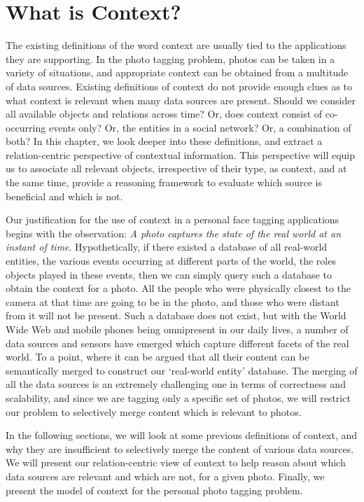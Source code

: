 \chapter{What is Context?}

The existing definitions of the word context are usually tied to the applications they are supporting. In the photo tagging problem, photos can be taken in a variety of situations, and appropriate context can be obtained from a multitude of data sources. Existing definitions of context do not provide enough clues as to what context is relevant when many data sources are present. Should we consider all available objects and relations across time? Or, does context consist of co-occurring events only? Or, the entities in a social network? Or, a combination of both? In this chapter, we look deeper into these definitions, and extract a relation-centric perspective of contextual information. This perspective will equip us to associate all relevant objects, irrespective of their type, as context, and at the same time, provide a reasoning framework to evaluate which source is beneficial and which is not.

Our justification for the use of context in a personal face tagging applications begins with the observation: \textit{A photo captures the state of the real world at an instant of time}. Hypothetically, if there existed a database of all real-world entities, the various events occurring at different parts of the world, the roles objects played in these events, then we can simply query such a database to obtain the context for a photo. All the people who were physically closest to the camera at that time are going to be in the photo, and those who were distant from it will not be present. Such a database does not exist, but with the World Wide Web and mobile phones being omnipresent in our daily lives, a number of data sources and sensors have emerged which capture different facets of the real world. To a point, where it can be argued that all their content can be semantically merged to construct our `real-world entity' database. The merging of all the data sources is an extremely challenging one in terms of correctness and scalability, and since we are tagging only a specific set of photos, we will restrict our problem to selectively merge content which is relevant to photos.

In the following sections, we will look at some previous definitions of context, and why they are insufficient to selectively merge the content of various data sources. We will present our relation-centric view of context to help reason about which data sources are relevant and which are not, for a given photo. Finally, we present the model of context for the personal photo tagging problem.

